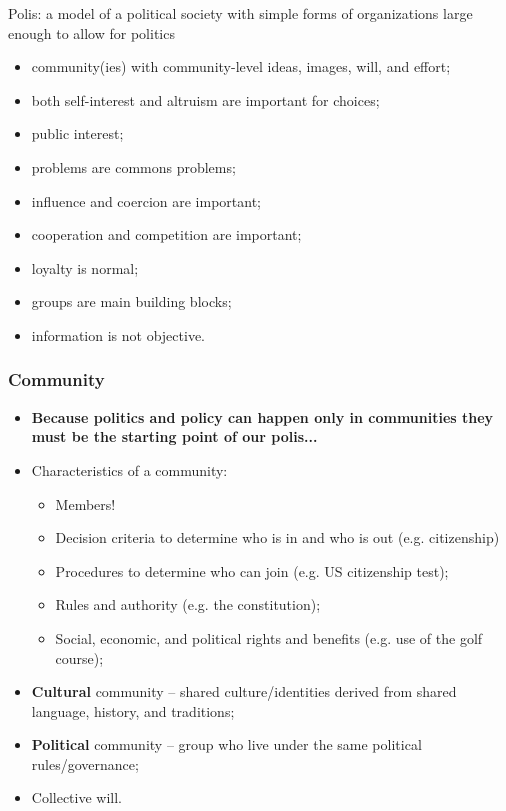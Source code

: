 \documentclass[aspectratio=169]{beamer}
\theoremstyle{principle}
\begin{document}
\begin{frame}
\begin{center}
\Large Polis: a model of a political society with simple forms of organizations large enough to allow for politics
\end{center}
\begin{itemize}
\item community(ies) with community-level ideas, images, will, and effort;
\item both self-interest and altruism are important for choices;
\item public interest;
\item problems are commons problems;
\item influence and coercion are important;
\item cooperation and competition are important;
\item loyalty is normal;
\item groups are main building blocks;
\item information is not objective.
\end{itemize}
\end{frame}

\begin{frame}
\frametitle{Community}
\begin{itemize}
\item \textbf{Because politics and policy can happen only in communities they must be the starting point of our polis...}
\bigskip
\item Characteristics of a community:
\begin{itemize}
\item Members!
\item Decision criteria to determine who is in and who is out (e.g. citizenship) 
\item Procedures to determine who can join (e.g. US citizenship test);
\item Rules and authority (e.g. the constitution);
\item Social, economic, and political rights and benefits (e.g. use of the golf course);
\end{itemize}
\bigskip
\bigskip
\item \textbf{Cultural} community -- shared culture/identities derived from shared language, history, and traditions;
\bigskip
\bigskip
\item \textbf{Political} community -- group who live under the same political rules/governance;
\bigskip
\bigskip
\item Collective will.
\end{itemize}
\end{frame}
\end{document}
